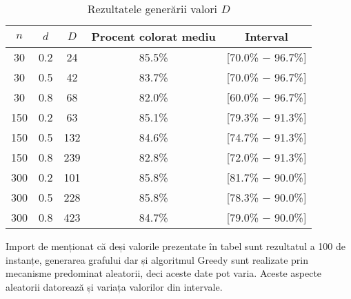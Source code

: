 \begin{table}[H]
\centering
\caption{Rezultatele generării valori $D$}
\begin{tabular}{ccccc}
\toprule
$n$ & $d$ & $D$ & Procent colorat mediu & Interval\\
\midrule
30  & 0.2 & 24       & 85.5\% & [70.0\% $-$ 96.7\%] \\
30  & 0.5 & 42       & 83.7\% & [70.0\% $-$ 96.7\%]\\
30  & 0.8 & 68       & 82.0\% & [60.0\% $-$ 96.7\%]\\
150 & 0.2 & 63       & 85.1\% & [79.3\% $-$ 91.3\%]\\
150 & 0.5 & 132      & 84.6\% & [74.7\% $-$ 91.3\%]\\
150 & 0.8 & 239      & 82.8\% & [72.0\% $-$ 91.3\%]\\
300 & 0.2 & 101      & 85.8\% & [81.7\% $-$ 90.0\%]\\
300 & 0.5 & 228      & 85.8\% & [78.3\% $-$ 90.0\%]\\
300 & 0.8 & 423      & 84.7\% & [79.0\% $-$ 90.0\%]\\
\bottomrule
\end{tabular}\label{tab:rezultate_booktabs}
\end{table}

Import de menționat că deși valorile prezentate în tabel sunt rezultatul a 100 de instanțe, generarea grafului dar și algoritmul Greedy sunt realizate prin mecanisme predominat aleatorii, deci aceste date pot varia. Aceste aspecte aleatorii datorează și variața valorilor din intervale.

